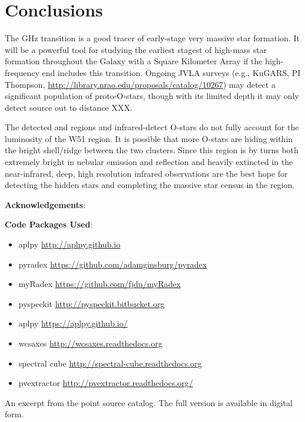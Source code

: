 \section{Conclusions}

The \formaldehyde {} GHz transition is a good tracer of early-stage
very massive star formation.  It will be a powerful tool for studying the earliest
stagest of high-mass star formation throughout the Galaxy with a Square
Kilometer Array if the high-frequency end includes this transition.  Ongoing
JVLA surveys (e.g., KuGARS, PI Thompson,
\url{http://library.nrao.edu/proposals/catalog/10267}) may detect a significant
population of proto-O-stars, though with its limited depth it may only detect
source out to
distance XXX.

The detected \uchii and \hchii regions and infrared-detect O-stars do not fully
account for the luminosity of the W51 region.  It is possible that more O-stars
are hiding within the bright shell/ridge between the two clusters.  Since this
region is by turns both extremely bright in nebular emission and reflection and
heavily extincted in the near-infrared, deep, high resolution infrared
observations are the best hope for detecting the hidden stars and completing
the massive star census in the region.


\textbf{Acknowledgements}:

\textbf{Code Packages Used}:

\begin{itemize}
    \item aplpy \url{http://aplpy.github.io}
    \item pyradex \url{https://github.com/adamginsburg/pyradex}
    \item myRadex \url{https://github.com/fjdu/myRadex}
    \item pyspeckit \url{http://pyspeckit.bitbucket.org}
    \item aplpy \url{https://aplpy.github.io/}
    \item wcsaxes \url{http://wcsaxes.readthedocs.org}
    \item spectral cube \url{http://spectral-cube.readthedocs.org}
    \item pvextractor \url{http://pvextractor.readthedocs.org/}
\end{itemize}

An excerpt from the point source catalog.  The full version is available in
digital form.




